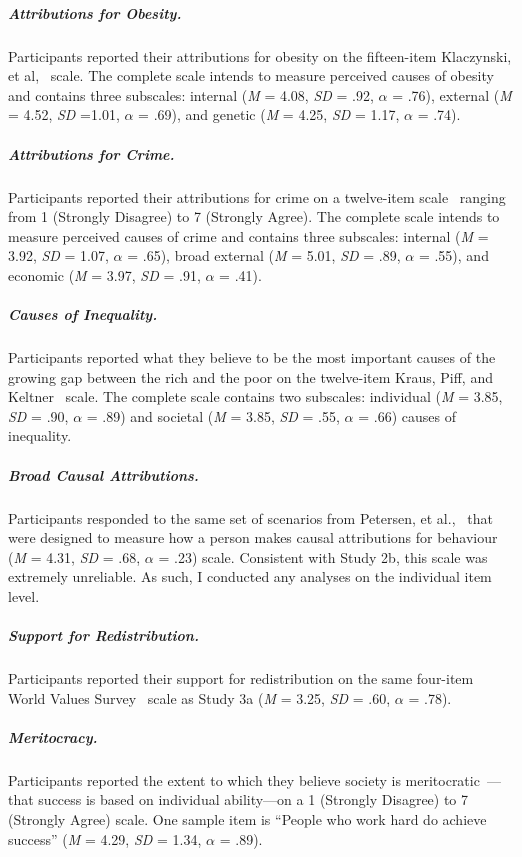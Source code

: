 \documentclass{sfuthesis}
\begin{document}
\subparagraph{Attributions for Obesity.} Participants reported their attributions for obesity on the fifteen-item Klaczynski, et al,~\cite{klaczynski04} scale. The complete scale intends to measure perceived causes of obesity and contains three subscales: internal (\textit{M} = 4.08, \textit{SD} = .92, $\alpha$ = .76), external (\textit{M} = 4.52, \textit{SD} =1.01, $\alpha$ = .69), and genetic (\textit{M} = 4.25, \textit{SD} = 1.17, $\alpha$ = .74).

\subparagraph{Attributions for Crime.} Participants reported their attributions for crime on a twelve-item scale~\cite{furnham83} ranging from 1 (Strongly Disagree) to 7 (Strongly Agree). The complete scale intends to measure perceived causes of crime and contains three subscales: internal (\textit{M} = 3.92, \textit{SD} = 1.07, $\alpha$ = .65), broad external (\textit{M} = 5.01, \textit{SD} = .89, $\alpha$ = .55), and economic (\textit{M} = 3.97, \textit{SD} = .91, $\alpha$ = .41).

\subparagraph{Causes of Inequality.} Participants reported what they believe to be the most important causes of the growing gap between the rich and the poor on the twelve-item Kraus, Piff, and Keltner~\cite{kraus09} scale. The complete scale contains two subscales: individual (\textit{M} = 3.85, \textit{SD} = .90, $\alpha$ = .89) and societal (\textit{M} = 3.85, \textit{SD} = .55, $\alpha$ = .66) causes of inequality.

\subparagraph{Broad Causal Attributions.} Participants responded to the same set of scenarios from Petersen, et al.,~\cite{petersen82} that were designed to measure how a person makes causal attributions for behaviour (\textit{M} = 4.31, \textit{SD} = .68, $\alpha$ = .23) scale. Consistent with Study 2b, this scale was extremely unreliable. As such, I conducted any analyses on the individual item level.

\subparagraph{Support for Redistribution.} Participants reported their support for redistribution on the same four-item World Values Survey~\cite{inglehart} scale as Study 3a (\textit{M} = 3.25, \textit{SD} = .60, $\alpha$ = .78).

\subparagraph{Meritocracy.} Participants reported the extent to which they believe society is meritocratic~\cite{zimmerman13}—that success is based on individual ability—on a 1 (Strongly Disagree) to 7 (Strongly Agree) scale. One sample item is “People who work hard do achieve success” (\textit{M} = 4.29, \textit{SD} = 1.34, $\alpha$ = .89).	
\end{document}
